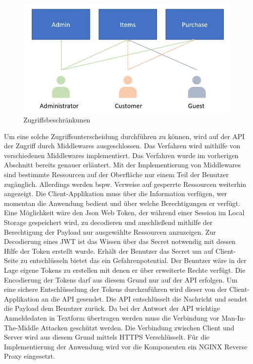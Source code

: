 \documentclass[utf8,biblatex]{lni}
\begin{document}
\begin{figure}
  \centering
  \includegraphics[width=\textwidth]{images/access.png}
  \caption[Zugriffsbeschränkunen]{Zugriffsbeschränkunen} 
  \label{access-desc}
\end{figure} 

Um eine solche Zugriffsunterscheidung durchführen zu können, wird auf der API der Zugriff durch Middlewares ausgeschlossen. 
Das Verfahren wird mithilfe von verschiedenen Middlewares implementiert. Das Verfahren wurde im vorherigen Abschnitt 
bereits genauer erläutert. 
Mit der Implementierung von Middlewares sind bestimmte Ressourcen auf der Oberfläche nur einem Teil der Benutzer zugänglich. 
Allerdings werden bspw. Verweise auf gesperrte Ressourcen weiterhin angezeigt. 
Die Client-Applikation muss über die Information verfügen, wer momentan die Anwendung bedient und über welche Berechtigungen er verfügt. 
Eine Möglichkeit wäre den Json Web Token, der während einer Session im Local Storage gespeichert wird, zu decodieren und anschließend 
mithilfe der Berechtigung der Payload nur ausgewählte Ressourcen anzuzeigen. 
Zur Decodierung eines JWT ist das Wissen über das Secret notwendig mit dessen Hilfe der Token erstellt wurde. 
Erhält der Benutzer das Secret um auf Client-Seite zu entschlüsseln bietet das ein Gefahrenpotential. 
Der Benutzer wäre in der Lage eigene Tokens zu erstellen mit denen er über erweiterte Rechte verfügt. 
Die Encodierung der Tokens darf aus diesem Grund nur auf der API erfolgen. 
Um eine sichere Entschlüsselung der Tokens durchzuführen wird dieser von der Client-Applikation an die API 
gesendet. Die API entschlüsselt die Nachricht und sendet die Payload dem Benutzer zurück. 
Da bei der Antwort der API wichtige Anmeldedaten in Textform übertragen werden muss die Verbindung vor Man-In-The-Middle Attacken geschützt werden. 
Die Verbindung zwischen Client und Server wird aus diesem Grund mittels HTTPS Verschlüsselt. 
Für die Implementierung der Anwendung wird vor die Komponenten ein NGINX Reverse Proxy eingesetzt. 
\end{document}
